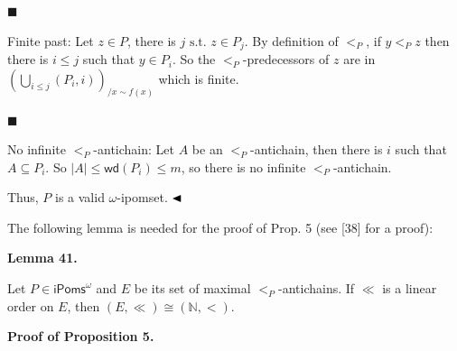 \documentclass[10pt,a4paper]{article}
\begin{document}
 
 
\par\noindent  $\blacksquare$ 
 
Finite past: Let $z\in P$, there is $j\text{ s.t.\ }z\in P_{j}$. By definition of $<_{P}$, if $y<_{P}z$ then there is $i\leqslant j$ such that $y\in P_{i}$. So the $<_{P}$-predecessors of $z$ are in $(\bigcup_{i\leqslant j}(P_{i},i))_{/x\sim f(x)}$ which is finite.\par
 
 
 
\par\noindent  $\blacksquare$ 
 
No infinite $<_{P}$-antichain: Let $A$ be an $<_{P}$-antichain, then there is $i$ such that $A\subseteq P_{i}$. So $|A|\leqslant\mathsf{wd}(P_{i})\leqslant m$, so there is no infinite $<_{P}$-antichain.\par
 
 
  
Thus, $P$ is a valid $\omega$-ipomset. $\hfill\blacktriangleleft$\par
 
 
 
The following lemma is needed for the proof of Prop. 5 (see [38] for a proof):\par
 
 
 
\par\medskip\noindent\textbf{Lemma 41.}\par
 
 
Let $P\in{\mathsf{iPoms}^{\omega}}$ and $E$ be its set of maximal $<_{P}$-antichains. If $\ll$ is a linear order on $E$, then $(E,\ll)\cong(\mathbb{N},<)$.\par
 
 
 
 
 
\par\medskip\noindent\textbf{Proof of Proposition 5.}\par
 
\end{document}
